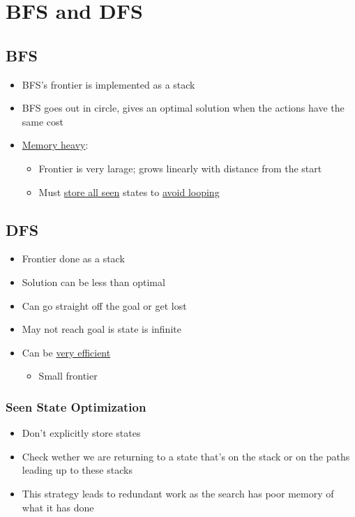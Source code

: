 \section{BFS and DFS}

  \subsection{BFS}

    \begin{itemize}
      \item BFS's frontier is implemented as a stack
      \item BFS goes out in circle, gives an optimal solution
      when the actions have the same cost
      \item \ul{Memory heavy}:
      \begin{itemize}
        \item Frontier is very larage; grows linearly with distance from the start
        \item Must \ul{store all seen} states to \ul{avoid looping}
      \end{itemize}
    \end{itemize}

  \subsection{DFS}

    \begin{itemize}
      \item Frontier done as a stack
      \item Solution can be less than optimal
      \item Can go straight off the goal or get lost
      \item May not reach goal is state is infinite
      \item Can be \ul{very efficient}
      \begin{itemize}
        \item Small frontier
      \end{itemize}
    \end{itemize}

    \subsubsection{Seen State Optimization}

      \begin{itemize}
        \item Don't explicitly store states
        \item Check wether we are returning to a state that's on the stack
        or on the paths leading up to these stacks
        \item This strategy leads to redundant work as the search
        has poor memory of what it has done
      \end{itemize}


